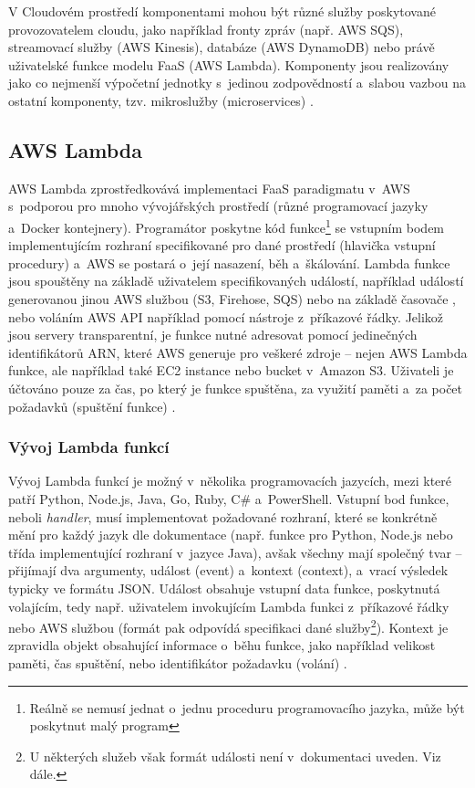 \documentclass[czech, ing, kiv, he, iso690]{fasthesis}
\begin{document}
V Cloudovém prostředí komponentami mohou být různé služby poskytované provozovatelem cloudu, jako například fronty zpráv (např. AWS SQS), streamovací služby (AWS Kinesis), databáze (AWS DynamoDB) nebo právě uživatelské funkce modelu FaaS (AWS Lambda). Komponenty jsou realizovány jako co nejmenší výpočetní jednotky s~jedinou zodpovědností a~slabou vazbou na ostatní komponenty, tzv. mikroslužby (microservices) \cite{designing_distributed_systems, distrib_sys_4}.

\subsection{AWS Lambda}
\label{sec:aws-lambda}
AWS Lambda zprostředkovává implementaci FaaS paradigmatu v~AWS s~podporou pro mnoho vývojářských prostředí (různé programovací jazyky a~Docker kontejnery). Programátor poskytne kód funkce\footnote{Reálně se nemusí jednat o~jednu proceduru programovacího jazyka, může být poskytnut malý program} se vstupním bodem implementujícím rozhraní specifikované pro dané prostředí (hlavička vstupní procedury) a~AWS se postará o~její nasazení, běh a~škálování. Lambda funkce jsou spouštěny na základě uživatelem specifikovaných událostí, například událostí generovanou jinou AWS službou (S3, Firehose, SQS) nebo na základě časovače \cite{lambda.docs.aws}, nebo voláním AWS API například pomocí nástroje z~příkazové řádky. Jelikož jsou servery transparentní, je funkce nutné adresovat pomocí jedinečných identifikátorů ARN, které AWS generuje pro veškeré zdroje -- nejen AWS Lambda funkce, ale například také EC2 instance nebo bucket v~Amazon S3. Uživateli je účtováno pouze za čas, po který je funkce spuštěna, za využití paměti a~za počet požadavků (spuštění funkce) \cite{lambda.pricing.aws}.

\subsubsection{Vývoj Lambda funkcí}
Vývoj Lambda funkcí je možný v~několika programovacích jazycích, mezi které patří Python, Node.js, Java, Go, Ruby, C\# a~PowerShell. Vstupní bod funkce, neboli \emph{handler}, musí implementovat požadované rozhraní, které se konkrétně mění pro každý jazyk dle dokumentace (např. funkce pro Python, Node.js nebo třída implementující rozhraní v~jazyce Java), avšak všechny mají společný tvar -- přijímají dva argumenty, událost (event) a~kontext (context), a~vrací výsledek typicky ve formátu JSON. Událost obsahuje vstupní data funkce, poskytnutá volajícím, tedy např. uživatelem invokujícím Lambda funkci z~příkazové řádky nebo AWS službou (formát pak odpovídá specifikaci dané služby\footnote{U některých služeb však formát události není v~dokumentaci uveden. Viz dále.}). Kontext je zpravidla objekt obsahující informace o~běhu funkce, jako například velikost paměti, čas spuštění, nebo identifikátor požadavku (volání) \cite{lambda.docs.aws}.
\end{document}
